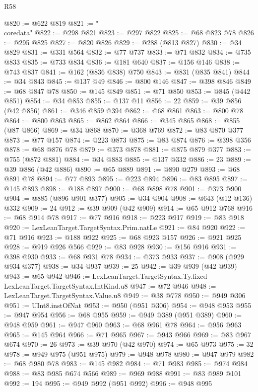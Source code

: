 \begin{lexlean}{R58}
\begin{coremodule}
{{@820 := @622 @819
@821 := "\\coredata"
@822 := @298 @821
@823 := @297 @822
@825 := @68 @823 @78
@826 := @295 @825
@827 := @820 @826
@829 := @288 (@813 @827)
@830 := @34 @829
@831 := @331 @564
@832 := @77 @737
@833 := @71 @832
@834 := @735 @833
@835 := @733 @834
@836 := @181 @640
@837 := @156 @146
@838 := @743 @837
@841 := @162 (@836 @838) @750
@843 := @831 (@835 @841)
@844 := @34 @843
@845 := @137 @49
@846 := @800 @146
@847 := @398 @846
@849 := @68 @847 @78
@850 := @145 @849
@851 := @71 @850
@853 := @845 (@442 @851)
@854 := @34 @853
@855 := @137 @11
@856 := 22
@859 := @39 @856 (@42 @856)
@861 := @346 @859 @394
@862 := @68 @861
@863 := @800 @78
@864 := @800 @863
@865 := @862 @864
@866 := @345 @865
@868 := @855 (@87 @866)
@869 := @34 @868
@870 := @368 @769
@872 := @83 @870 @377
@873 := @77 @157
@874 := @223 @873
@875 := @83 @874
@876 := @398 @356
@878 := @68 @876 @78
@879 := @373 @878
@881 := @875 @879 @377
@883 := @755 (@872 @881)
@884 := @34 @883
@885 := @137 @332
@886 := 23
@889 := @39 @886 (@42 @886)
@890 := @65 @889
@891 := @890 @279
@893 := @68 @891 @78
@894 := @77 @893
@895 := @223 @894
@896 := @83 @895
@897 := @145 @893
@898 := @188 @897
@900 := @68 @898 @78
@901 := @373 @900
@904 := @885 (@896 @901 @377)
@905 := @34 @904
@908 := @643 (@12 @136) @332
@909 := 24
@912 := @39 @909 (@42 @909)
@914 := @65 @912 @768
@916 := @68 @914 @78
@917 := @77 @916
@918 := @223 @917
@919 := @83 @918
@920 := LexLeanTarget.TargetSyntax.Prim.natLe
@921 := @84 @920
@922 := @71 @916
@923 := @188 @922
@925 := @68 @923 @157
@926 := @921 @925
@928 := @919 @926 @566
@929 := @83 @928
@930 := @156 @916
@931 := @398 @930
@933 := @68 @931 @78
@934 := @373 @933
@937 := @908 (@929 @934 @377)
@938 := @34 @937
@939 := 25
@942 := @39 @939 (@42 @939)
@943 := @65 @942
@946 := LexLeanTarget.TargetSyntax.Ty.fixed LexLeanTarget.TargetSyntax.IntKind.u8
@947 := @72 @946
@948 := LexLeanTarget.TargetSyntax.Value.u8
@949 := @38 @778
@950 := @949 @306
@951 := UInt8.instOfNat
@953 := @950 (@951 @306)
@954 := @948 @953
@955 := @947 @954
@956 := @68 @955
@959 := @949 @389 (@951 @389)
@960 := @948 @959
@961 := @947 @960
@963 := @68 @961 @78
@964 := @956 @963
@965 := @145 @964
@966 := @71 @965
@967 := @943 @966
@969 := @83 @967 @674
@970 := 26
@973 := @39 @970 (@42 @970)
@974 := @65 @973
@975 := 32
@978 := @949 @975 (@951 @975)
@979 := @948 @978
@980 := @947 @979
@982 := @68 @980 @78
@983 := @145 @982
@984 := @71 @983
@985 := @974 @984
@988 := @83 @985 @674 @566
@989 := @969 @988
@991 := @83 @989 @101
@992 := 194
@995 := @949 @992 (@951 @992)
@996 := @948 @995
}}
\end{coremodule}
\end{lexlean}
